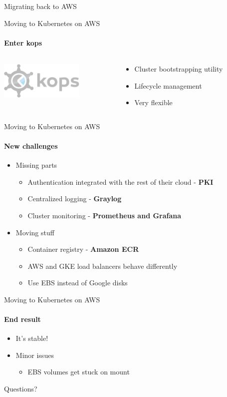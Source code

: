 \documentclass[17pt]{beamer}
\newcommand{\imageframe}[2]{{
  \usebackgroundtemplate{\texttt{[image: \#1]}}
  \begin{frame}{\vspace{-6pt}\usebeamercolor[fg]{item}#2}
  \end{frame}
}}
\begin{document}
  \imageframe{images/returning_cranes.jpg}{Migrating back to AWS}

  \begin{frame}{Moving to Kubernetes on AWS}
  \framesubtitle{Enter kops}
  \begin{columns}[c]
    \begin{column}{.3\textwidth}
      \includegraphics[width=4cm]{images/kops_logo.png}
    \end{column}
    \begin{column}{.7\textwidth}
      \begin{itemize}
        \item Cluster bootstrapping utility
        \item Lifecycle management
        \item Very flexible
      \end{itemize}
    \end{column}
  \end{columns}
  \end{frame}

  \begin{frame}{Moving to Kubernetes on AWS}
  \framesubtitle{New challenges}
  \begin{itemize}
    \item Missing parts
    \begin{itemize}
      \item Authentication integrated with the rest of their cloud - \textbf{PKI}
      \item Centralized logging - \textbf{Graylog}
      \item Cluster monitoring - \textbf{Prometheus and Grafana}
    \end{itemize}
    \item Moving stuff
    \begin{itemize}
      \item Container registry - \textbf{Amazon ECR}
      \item AWS and GKE load balancers behave differently
      \item Use EBS instead of Google disks
    \end{itemize}
  \end{itemize}
  \end{frame}

  \begin{frame}{Moving to Kubernetes on AWS}
  \framesubtitle{End result}
  \begin{itemize}
    \item It's stable!
    \bigskip
    \item Minor issues
    \begin{itemize}
      \item EBS volumes get stuck on mount
    \end{itemize}
  \end{itemize}
  \end{frame}

  \imageframe{images/questions.jpg}{Questions?}
\end{document}
